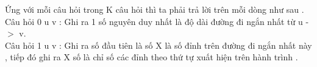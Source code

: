 Ứng với mỗi câu hỏi trong K câu hỏi thì ta phải trả lời trên mỗi dòng như sau .   
\\   Câu hỏi 0 u v : Ghi ra 1 số nguyên duy nhất là độ dài đường đi ngắn nhất từ u -$>$ v.   
\\   Câu hỏi 1 u v : Ghi ra số đầu tiên là số X là số đỉnh trên đường đi ngắn nhất này , tiếp đó ghi ra X số là chỉ số các đỉnh theo thứ tự xuất hiện trên hành trình .   
\\

\